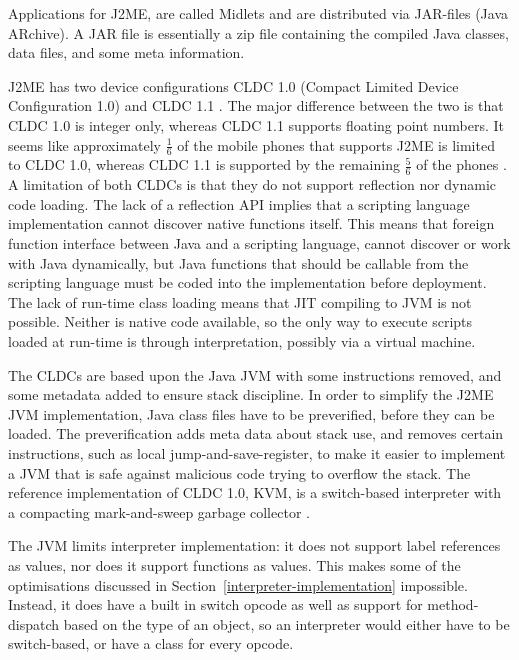 \documentclass[11pt]{report}
\begin{document}
Applications for J2ME, are called Midlets and are distributed via JAR-files (Java ARchive). A JAR file is essentially a zip file containing the compiled Java classes, data files, and some meta information.

J2ME has two device configurations CLDC 1.0 (Compact Limited Device Configuration 1.0) \cite{cldc10}  and CLDC 1.1  \cite{cldc11}. The major difference between the two is that CLDC 1.0 is integer only, whereas CLDC 1.1 supports floating point numbers.
It seems like approximately $\frac{1}{6}$ of the mobile phones that supports J2ME is limited to CLDC 1.0, whereas CLDC 1.1 is supported by the remaining $\frac{5}{6}$ of the phones \cite{mobref}.
A limitation of both CLDCs is that they do not support reflection nor dynamic code loading.
The lack of a reflection API implies that a scripting language implementation cannot discover native functions itself. This means that foreign function interface between Java and a scripting language, cannot discover or work with Java dynamically, but Java functions that should be callable from the scripting language must be coded into the implementation before deployment.
The lack of run-time class loading means that JIT compiling to JVM is not possible.
Neither is native code available, so the only way to execute scripts loaded at run-time is through interpretation, possibly via a virtual machine.

The CLDCs are based upon the Java JVM \cite{jvmref} with some instructions removed, and some metadata added to ensure stack discipline. 
In order to simplify the J2ME JVM implementation, Java class files have to be preverified, before they can be loaded.
The preverification adds meta data about stack use, and removes certain instructions, such as local jump-and-save-register, to make it easier to implement a JVM that is safe against malicious code trying to overflow the stack.
The reference implementation of CLDC 1.0, KVM, is a switch-based interpreter with a compacting mark-and-sweep garbage collector \cite{kvm}.

The JVM limits interpreter implementation: it does not support label references as values, nor does it support functions as values. This makes some of the optimisations discussed in 
Section~\ref{interpreter-implementation} impossible.
Instead, it does have a built in switch opcode as well as support for method-dispatch based on the type of an object, so an interpreter would either have to be switch-based, or have a class for every opcode.
\end{document}
